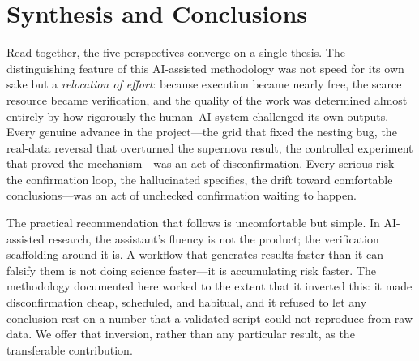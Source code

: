 \documentclass[11pt]{article}
\begin{document}
\section{Synthesis and Conclusions}
\label{sec:conclusion}

Read together, the five perspectives converge on a single thesis. The
distinguishing feature of this AI-assisted methodology was not speed for its own
sake but a \emph{relocation of effort}: because execution became nearly free, the
scarce resource became verification, and the quality of the work was determined
almost entirely by how rigorously the human--AI system challenged its own outputs.
Every genuine advance in the project---the grid that fixed the nesting bug, the
real-data reversal that overturned the supernova result, the controlled experiment
that proved the mechanism---was an act of disconfirmation. Every serious risk---the
confirmation loop, the hallucinated specifics, the drift toward comfortable
conclusions---was an act of unchecked confirmation waiting to happen.

The practical recommendation that follows is uncomfortable but simple. In
AI-assisted research, the assistant's fluency is not the product; the verification
scaffolding around it is. A workflow that generates results faster than it can
falsify them is not doing science faster---it is accumulating risk faster. The
methodology documented here worked to the extent that it inverted this: it made
disconfirmation cheap, scheduled, and habitual, and it refused to let any
conclusion rest on a number that a validated script could not reproduce from raw
data. We offer that inversion, rather than any particular result, as the
transferable contribution.
\end{document}

